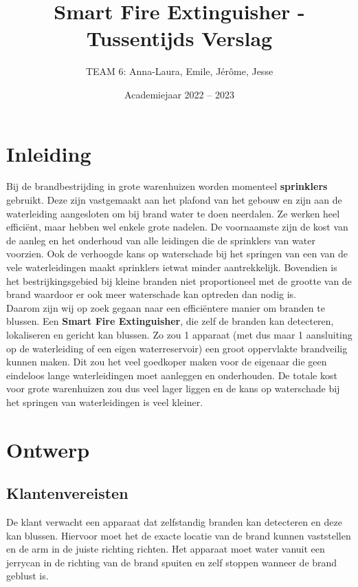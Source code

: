 \documentclass[kulak]{kulakarticle} %
\title{Smart Fire Extinguisher - Tussentijds Verslag}
\author{TEAM 6: Anna-Laura, Emile, Jérôme, Jesse}
\date{Academiejaar 2022 -- 2023}
\begin{document}
\maketitle



\section*{Inleiding}
                                          
Bij de brandbestrijding in grote warenhuizen worden momenteel \textbf{sprinklers} gebruikt. Deze zijn vastgemaakt aan het plafond van het gebouw en zijn aan de waterleiding aangesloten om bij brand water te doen neerdalen. Ze werken heel efficiënt, maar hebben wel enkele grote nadelen. De voornaamste zijn de kost van de aanleg en het onderhoud van alle leidingen die de sprinklers van water voorzien. Ook de verhoogde kans op waterschade bij het springen van een van de vele waterleidingen maakt sprinklers ietwat minder aantrekkelijk. Bovendien is het bestrijkingsgebied bij kleine branden niet proportioneel met de grootte van de brand waardoor er ook meer waterschade kan optreden dan nodig is. \\

Daarom zijn wij op zoek gegaan naar een efficiëntere manier om branden te blussen. Een \textbf{Smart Fire Extinguisher}, die zelf de branden kan detecteren, lokaliseren en gericht kan blussen. Zo zou 1 apparaat (met dus maar 1 aansluiting op de waterleiding of een eigen waterreservoir) een groot oppervlakte brandveilig kunnen maken. Dit zou het veel goedkoper maken voor de eigenaar die geen eindeloos lange waterleidingen moet aanleggen en onderhouden. De totale kost voor grote warenhuizen zou dus veel lager liggen en de kans op waterschade bij het springen van waterleidingen is veel kleiner.



\section{Ontwerp}
\subsection{Klantenvereisten}

De klant verwacht een apparaat dat zelfstandig branden kan detecteren en deze kan blussen. Hiervoor moet het de exacte locatie van de brand kunnen vaststellen en de arm in de juiste richting richten. Het apparaat moet water vanuit een jerrycan in de richting van de brand spuiten en zelf stoppen wanneer de brand geblust is. 
\end{document}

